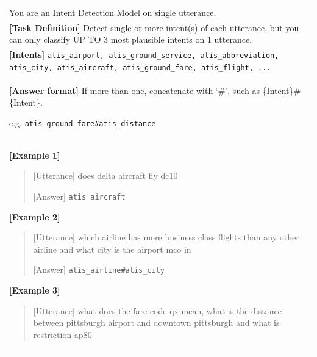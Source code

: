 \begin{table}
    \small
    \centering
    \renewcommand{\arraystretch}{1.5}
    \setlength{\tabcolsep}{0.5em}
    
    \begin{tabular}{>{\raggedright\arraybackslash}p{15cm}}
        \toprule
        You are an Intent Detection Model on single utterance. \\
        
        \textbf{[Task Definition]} Detect single or more intent(s) of each utterance, but you can only classify UP TO 3 most plausible intents on 1 utterance.\\
        
        \textbf{[Intents]} \texttt{atis\_airport, atis\_ground\_service, atis\_abbreviation, atis\_city, atis\_aircraft, atis\_ground\_fare, atis\_flight, ...} \\
        
        \textbf{[Answer format]} If more than one, concatenate with `\#', such as \{Intent\}\#\{Intent\}. 
        
        e.g. \texttt{atis\_ground\_fare\#atis\_distance} \\
        \arrayrulecolor{lightgray}\midrule\arrayrulecolor{black} 
        
            \textbf{[Example 1]}
            \begin{quote}
                {[Utterance]} does delta aircraft fly dc10
                
                {[Answer]} \texttt{atis\_aircraft} 
            \end{quote}
            
            \textbf{[Example 2]}
            \begin{quote}
                {[Utterance]} which airline has more business class flights than any other airline and what city is the airport mco in
                
                {[Answer]} \texttt{atis\_airline\#atis\_city} 
            \end{quote}
            
            \textbf{[Example 3]}
            \begin{quote}
            {[Utterance]} what does the fare code qx mean, what is the distance between pittsburgh airport and downtown pittsburgh and what is restriction ap80
            

\end{quote}
\end{tabular}
\end{table}
